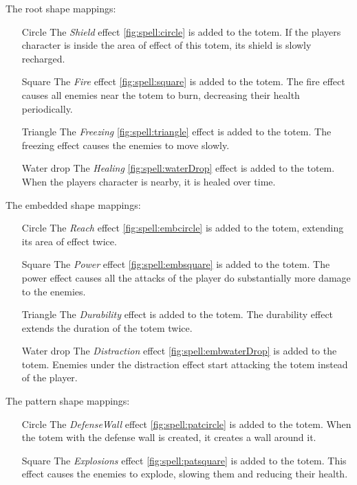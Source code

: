 \begin{description}
	\item The root shape mappings: 
	\begin{itemize}
		\item[Circle] The \emph{Shield} effect \ref{fig:spell:circle} is added to the totem. If the players character is inside the area of effect of this totem, its shield is slowly recharged.
		\item[Square] The \emph{Fire} effect \ref{fig:spell:square} is added to the totem. The fire effect causes all enemies near the totem to burn, decreasing their health periodically.
		\item[Triangle] The \emph{Freezing} \ref{fig:spell:triangle} effect is added to the totem. The freezing effect causes the enemies to move slowly.
		\item[Water drop] The \emph{Healing} \ref{fig:spell:waterDrop} effect is added to the totem. When the players character is nearby, it is healed over time.
	\end{itemize}
	\item The embedded shape mappings:
	\begin{itemize}
		\item[Circle] The \emph{Reach} effect \ref{fig:spell:embcircle} is added to the totem, extending its area of effect twice.
		\item[Square] The \emph{Power} effect \ref{fig:spell:embsquare} is added to the totem. The power effect causes all the attacks of the player do substantially more damage to the enemies.
		\item[Triangle] The \emph{Durability} effect is added to the totem. The durability effect extends the duration of the totem twice.
		\item[Water drop] The \emph{Distraction} effect \ref{fig:spell:embwaterDrop} is added to the totem. Enemies under the distraction effect start attacking the totem instead of the player.
	\end{itemize}
	\item The pattern shape mappings:
	\begin{itemize}
		\item[Circle] The \emph{DefenseWall} effect \ref{fig:spell:patcircle} is added to the totem. When the totem with the defense wall is created, it creates a wall around it.
		\item[Square] The \emph{Explosions} effect \ref{fig:spell:patsquare} is added to the totem. This effect causes the enemies to explode, slowing them and reducing their health.

\end{itemize}
\end{description}
